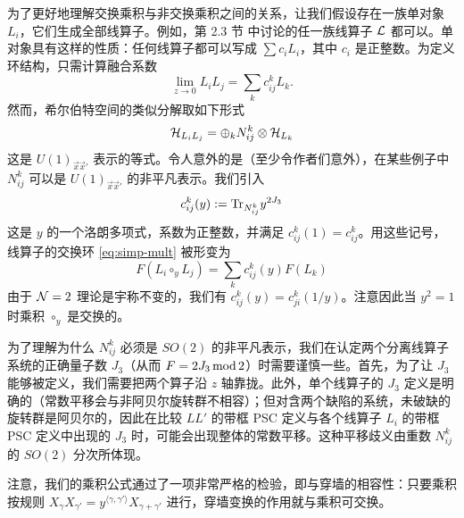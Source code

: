 为了更好地理解交换乘积与非交换乘积之间的关系，让我们假设存在一族单对象 $L_i$，它们生成全部线算子。例如，第 2.3 节%
中讨论的任一族线算子 $\mathcal{L}$ 都可以。单对象具有这样的性质：任何线算子都可以写成 $\sum c_i L_i$，其中 $c_i$ 是正整数。为定义环结构，只需计算融合系数
\begin{equation}\label{eq:simp-mult}
\lim_{z\to 0} L_i L_j = \sum_k c_{ij}^k L_k.
\end{equation}
然而，希尔伯特空间的类似分解取如下形式
\begin{equation}
\mathcal{H}_{L_i L_j}= \oplus_k  N_{ij}^k \otimes \mathcal{H}_{L_k}
\end{equation}
这是 $U(1)_{\vec x \vec x'}$ 表示的等式。令人意外的是（至少令作者们意外），在某些例子中 $N_{ij}^k$ 可以是 $U(1)_{\vec x \vec x'}$ 的非平凡表示。我们引入
\begin{equation}
c_{ij}^k(y) := {\operatorname{Tr}}_{N_{ij}^k} y^{2J_3}
\end{equation}
这是 $y$ 的一个洛朗多项式，系数为正整数，并满足 $c_{ij}^k(1) = c_{ij}^k$。用这些记号，线算子的交换环 \eqref{eq:simp-mult} 被形变为
\begin{equation}
F(L_i\circ_y L_j) = \sum_{k} c_{ij}^k(y) F(L_k)
\end{equation}
由于 $\mathcal{N}=2$ 理论是宇称不变的，我们有 $c_{ij}^k(y)= c_{ji}^k(1/y)$。注意因此当 $y^2=1$ 时乘积 $\circ_y$ 是交换的。

为了理解为什么 $N_{ij}^k$ 必须是 $SO(2)$ 的非平凡表示，我们在认定两个分离线算子系统的正确量子数 $J_3$（从而 $F = 2 J_3 \,{\rm mod}\, 2$）时需要谨慎一些。首先，为了让 $J_3$ 能够被定义，我们需要把两个算子沿 $z$ 轴靠拢。此外，单个线算子的 $J_3$ 定义是明确的（常数平移会与非阿贝尔旋转群不相容）；但对含两个缺陷的系统，未破缺的旋转群是阿贝尔的，因此在比较 $LL'$ 的带框 PSC 定义与各个线算子 $L_i$ 的带框 PSC 定义中出现的 $J_3$ 时，可能会出现整体的常数平移。这种平移歧义由重数 $N_{ij}^k$ 的 $SO(2)$ 分次所体现。

注意，我们的乘积公式通过了一项非常严格的检验，即与穿墙的相容性：只要乘积按规则 $X_\gamma X_{\gamma'} = y^{\langle \gamma,\gamma' \rangle} X_{\gamma+\gamma'}$ 进行，穿墙变换的作用就与乘积可交换。
